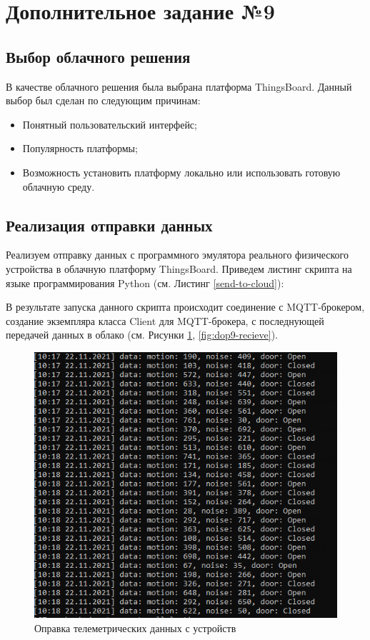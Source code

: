 \documentclass[a4paper,14pt]{extarticle}
\begin{document}

\section{Дополнительное задание №9}
\subsection{Выбор облачного решения}

В качестве облачного решения была выбрана платформа ThingsBoard. Данный выбор был сделан по следующим причинам:
\begin{itemize}
	\item Понятный пользовательский интерфейс;
	\item Популярность платформы;
	\item Возможность установить платформу локально или использовать готовую облачную среду.
\end{itemize}


\subsection{Реализация отправки данных}

Реализуем отправку данных с программного эмулятора реального физического устройства в облачную платформу ThingsBoard. Приведем листинг скрипта на языке программирования Python (см. Листинг \ref{send-to-cloud}):



В результате запуска данного скрипта происходит соединение с MQTT-брокером, создание экземпляра класса Client для MQTT-брокера, с последнующей передачей данных в облако (см. Рисунки \ref{fig:dop9-send},  \ref{fig:dop9-recieve}).


\begin{figure}[h!]
	\centering
	\includegraphics[width=0.6\linewidth]{images/dop9-send}
	\caption{Оправка телеметрических данных с устройств }
	\label{fig:dop9-send}
\end{figure}
\end{document}
